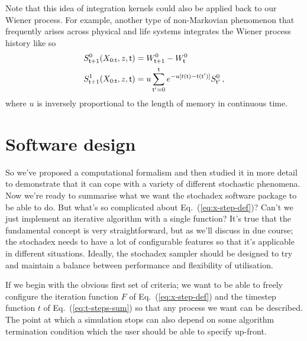 Note that this idea of integration kernels could also be applied back to our Wiener process. For example, another type of non-Markovian phenomenon that frequently arises across physical and life systems integrates the Wiener process history like so
\begin{align}
S^{0}_{{\sf t}+1}(X_{0:{\sf t}},z,{\sf t}) &= W^0_{{\sf t}+1}-W^0_{\sf t}\\
S^{1}_{{\sf t}+1}(X_{0:{\sf t}},z,{\sf t}) &= u\sum^{{\sf t}}_{{\sf t}'=0}e^{-u[t({\sf t})-t({\sf t}')]} S^{0}_{{\sf t}'}\,,
\end{align}
where $u$ is inversely proportional to the length of memory in continuous time.

\section{\sffamily Software design}

So we've proposed a computational formalism and then studied it in more detail to demonstrate that it can cope with a variety of different stochastic phenomena. Now we're ready to summarise what we want the stochadex software package to be able to do. But what's so complicated about Eq.~(\ref{eq:x-step-def})? Can't we just implement an iterative algorithm with a single function? It's true that the fundamental concept is very straightforward, but as we'll discuss in due course; the stochadex needs to have a lot of configurable features so that it's applicable in different situations. Ideally, the stochadex sampler should be designed to try and maintain a balance between performance and flexibility of utilisation.

If we begin with the obvious first set of criteria; we want to be able to freely configure the iteration function $F$ of Eq.~(\ref{eq:x-step-def}) and the timestep function $t$ of Eq.~(\ref{eq:t-steps-sum}) so that any process we want can be described. The point at which a simulation stops can also depend on some algorithm termination condition which the user should be able to specify up-front.


